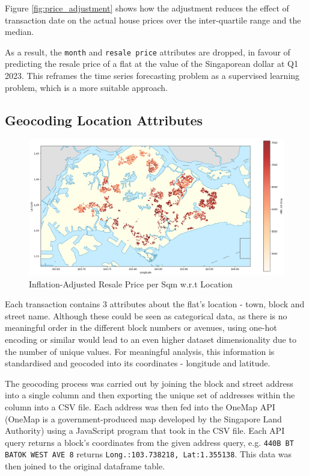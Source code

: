 \documentclass[[12pt,conference]{IEEEtran}
\begin{document}
Figure \ref{fig:price_adjustment} shows how the adjustment reduces the effect of transaction date on the actual house prices over the inter-quartile range and the median.


As a result, the \texttt{month} and \texttt{resale price} attributes are dropped, in favour of predicting the resale price of a flat at the value of the Singaporean dollar at Q1 2023. 
This reframes the time series forecasting problem as a supervised learning problem, which is a more suitable approach.



\subsection{Geocoding Location Attributes}

\begin{figure}[H]
    \centering
    \includegraphics[width=\linewidth]{price_geography.png}
    \caption{Inflation-Adjusted Resale Price per Sqm w.r.t Location}
    \label{fig:price_geography}
\end{figure}

Each transaction contains 3 attributes about the flat's location - town, block and street name. Although these could be seen as categorical data, as there is no meaningful order in the different block numbers or avenues, using one-hot encoding or similar would lead to an even higher dataset dimensionality due to the number of unique values.  
For meaningful analysis, this information is standardised and geocoded into its coordinates - longitude and latitude.

The geocoding process was carried out by joining the block and street address into a single column and then exporting the unique set of addresses within the column into a CSV file. Each address was then fed into the OneMap API (OneMap is a government-produced map developed by the Singapore Land Authority) using a JavaScript program that took in the CSV file. Each API query returns a block's coordinates from the given address query, e.g. \texttt{440B BT BATOK WEST AVE 8} returns \texttt{Long.:103.738218, Lat:1.355138}. This data was then joined to the original dataframe table.
\end{document}
